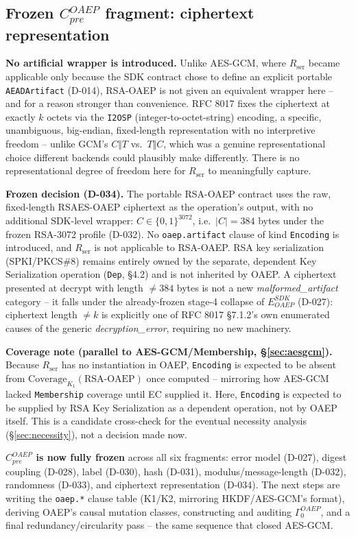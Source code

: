 \documentclass[11pt,a4paper]{article}
\begin{document}
\subsection{Frozen $C_{pre}^{OAEP}$ fragment: ciphertext representation}\label{sec:oaep-ciphertext}
\textbf{No artificial wrapper is introduced.} Unlike AES-GCM, where $R_{\text{ser}}$ became applicable only because the SDK contract chose to define an explicit portable \texttt{AEADArtifact} (D-014), RSA-OAEP is not given an equivalent wrapper here -- and for a reason stronger than convenience. RFC 8017 fixes the ciphertext at exactly $k$ octets via the \texttt{I2OSP} (integer-to-octet-string) encoding, a specific, unambiguous, big-endian, fixed-length representation with no interpretive freedom -- unlike GCM's $C\Vert T$ vs.\ $T\Vert C$, which was a genuine representational choice different backends could plausibly make differently. There is no representational degree of freedom here for $R_{\text{ser}}$ to meaningfully capture.

\textbf{Frozen decision (D-034).} The portable RSA-OAEP contract uses the raw, fixed-length RSAES-OAEP ciphertext as the operation's output, with no additional SDK-level wrapper: $C \in \{0,1\}^{3072}$, i.e.\ $|C| = 384$ bytes under the frozen RSA-3072 profile (D-032). No \texttt{oaep.artifact} clause of kind \texttt{Encoding} is introduced, and $R_{\text{ser}}$ is not applicable to RSA-OAEP. RSA key serialization (SPKI/PKCS\#8) remains entirely owned by the separate, dependent Key Serialization operation (\texttt{Dep}, \S4.2) and is not inherited by OAEP. A ciphertext presented at decrypt with length $\neq 384$ bytes is not a new \emph{malformed\_artifact} category -- it falls under the already-frozen stage-4 collapse of $E_{OAEP}^{SDK}$ (D-027): ciphertext length $\neq k$ is explicitly one of RFC 8017 \S7.1.2's own enumerated causes of the generic \emph{decryption\_error}, requiring no new machinery.

\textbf{Coverage note (parallel to AES-GCM/Membership, \S\ref{sec:aesgcm}).} Because $R_{\text{ser}}$ has no instantiation in OAEP, \texttt{Encoding} is expected to be absent from $\text{Coverage}_{K_1}(\text{RSA-OAEP})$ once computed -- mirroring how AES-GCM lacked \texttt{Membership} coverage until EC supplied it. Here, \texttt{Encoding} is expected to be supplied by RSA Key Serialization as a dependent operation, not by OAEP itself. This is a candidate cross-check for the eventual necessity analysis (\S\ref{sec:necessity}), not a decision made now.

\textbf{$C_{pre}^{OAEP}$ is now fully frozen} across all six fragments: error model (D-027), digest coupling (D-028), label (D-030), hash (D-031), modulus/message-length (D-032), randomness (D-033), and ciphertext representation (D-034). The next steps are writing the \texttt{oaep.*} clause table (K1/K2, mirroring HKDF/AES-GCM's format), deriving OAEP's causal mutation classes, constructing and auditing $\Gamma_0^{OAEP}$, and a final redundancy/circularity pass -- the same sequence that closed AES-GCM.
\end{document}
